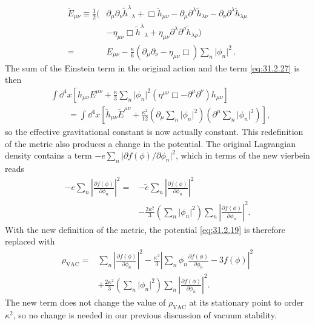 \begin{equation}
  \begin{aligned}
  \widetilde E_{\mu\nu}\equiv\frac12\bigl(
    &\partial_\mu\partial_\nu\widetilde h^\lambda{}_\lambda
     +\Box\widetilde h_{\mu\nu}
     -\partial_\mu\partial^\lambda\widetilde h_{\lambda\nu}
     -\partial_\nu\partial^\lambda\widetilde h_{\lambda\mu}
  \\
    &-\eta_{\mu\nu}\Box\widetilde h^\lambda{}_\lambda
     +\eta_{\mu\nu}\partial^\lambda\partial^\rho
      \widetilde h_{\lambda\rho}
  \bigr)
  \\
  ={}&E_{\mu\nu}
      -\frac{\kappa}{6}
       \left(\partial_\mu\partial_\nu-\eta_{\mu\nu}\Box\right)
       \sum_n\lvert\phi_n\rvert^2\,.
  \end{aligned}
  \tag{31.2.32}\label{eq:31.2.32}
\end{equation}
The sum of the Einstein term in the original action and the term
\eqref{eq:31.2.27} is then
\begin{equation}
  \begin{aligned}
  &\int \dd^4x
   \left[
     h_{\mu\nu}E^{\mu\nu}
     +\frac{\kappa}{3}\sum_n\lvert\phi_n\rvert^2
      \left(\eta^{\mu\nu}\Box-\partial^\mu\partial^\nu\right)h_{\mu\nu}
   \right]
  \\
  &\qquad
  =\int \dd^4x
   \left[
     \widetilde h_{\mu\nu}\widetilde E^{\mu\nu}
     +\frac{\kappa^2}{12}
      \left(\partial_\mu\sum_n\lvert\phi_n\rvert^2\right)
      \left(\partial^\mu\sum_n\lvert\phi_n\rvert^2\right)
   \right],
  \end{aligned}
  \tag{31.2.33}\label{eq:31.2.33}
\end{equation}
so the effective gravitational constant is now actually constant. This
redefinition of the metric also produces a change in the potential. The
original Lagrangian density contains a term
\(-e\sum_n\lvert\partial f(\phi)/\partial\phi_n\rvert^2\), which in terms of
the new vierbein reads
\[
  \begin{aligned}
  -e\sum_n\left\lvert\frac{\partial f(\phi)}{\partial\phi_n}\right\rvert^2
  ={}&
  -\widetilde e
   \sum_n\left\lvert\frac{\partial f(\phi)}{\partial\phi_n}\right\rvert^2
  \\
  &-\frac{2\kappa^2}{3}
   \left(\sum_n\lvert\phi_n\rvert^2\right)
   \sum_n\left\lvert\frac{\partial f(\phi)}{\partial\phi_n}\right\rvert^2.
  \end{aligned}
\]
With the new definition of the metric, the potential \eqref{eq:31.2.19} is
therefore replaced with
\begin{equation}
  \begin{aligned}
  \rho_{\mathrm{VAC}}={}&
    \sum_n
    \left\lvert\frac{\partial f(\phi)}{\partial\phi_n}\right\rvert^2
    -\frac{\kappa^2}{3}
     \left\lvert
       \sum_n\phi_n\frac{\partial f(\phi)}{\partial\phi_n}
       -3f(\phi)
     \right\rvert^2
  \\
  &+\frac{2\kappa^2}{3}
    \left(\sum_n\lvert\phi_n\rvert^2\right)
    \sum_n
    \left\lvert\frac{\partial f(\phi)}{\partial\phi_n}\right\rvert^2.
  \end{aligned}
  \tag{31.2.34}\label{eq:31.2.34}
\end{equation}
The new term does not change the value of \(\rho_{\mathrm{VAC}}\) at its
stationary point to order \(\kappa^2\), so no change is needed in our previous
discussion of vacuum stability.
